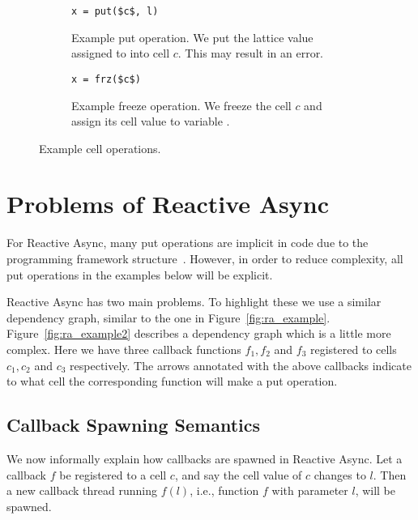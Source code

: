 \begin{figure}
  \centering
  \begin{subfigure}[t]{0.4\textwidth}
    \begin{lstlisting}[numbers=none,mathescape=true]
x = put($c$, l)
    \end{lstlisting}
    \caption{Example put operation. We put the lattice value assigned to  into
    cell $c$. This may result in an error.}
  \end{subfigure}
  \quad
  \begin{subfigure}[t]{0.4\textwidth}
    \begin{lstlisting}[numbers=none,mathescape=true]
x = frz($c$)
    \end{lstlisting}
    \caption{Example freeze operation. We freeze the cell $c$ and assign its cell
    value to variable .}
  \end{subfigure}
  \caption{Example cell operations.}
  \label{fig:ex_cell_op}
\end{figure}

\section{Problems of Reactive Async}%
\label{sec:problems_of_reactive_async}

For Reactive Async, many put operations are implicit in code due to the
programming framework structure~\parencite{conf/scala/HallerGES16}. However, in
order to reduce complexity, all put operations in the examples below will be
explicit.

Reactive Async has two main problems. To highlight these we use a similar
dependency graph, similar to the one in Figure~\ref{fig:ra_example}.
Figure~\ref{fig:ra_example2} describes a dependency graph which is a little more
complex. Here we have three callback functions $f_1, f_2$ and $f_3$ registered
to cells $c_1, c_2$ and $c_3$ respectively. The arrows annotated with the above
callbacks indicate to what cell the corresponding function will make a
put operation.

\subsection{Callback Spawning Semantics}%
\label{sub:callback_spawning_semantics_ra}

We now informally explain how callbacks are spawned in Reactive Async.  Let a
callback $f$ be registered to a cell $c$, and say the cell value of $c$ changes
to $l$. Then a new callback thread running $f(l)$, i.e., function $f$ with
parameter $l$, will be spawned.

